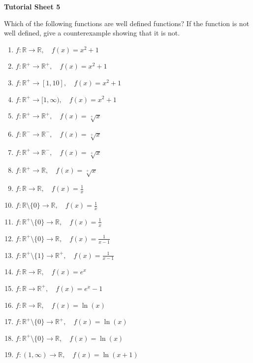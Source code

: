 \documentclass[]{article}
\begin{document}
		\begin{center}
			\textbf{Tutorial Sheet 5}
		\end{center}
		\newpage
		Which of the following functions are well defined functions? If the function is not well defined, give a counterexample showing that it is not.
		\begin{multicols}{2}
			\begin{enumerate}
				\item $f: \mathbb{R} \to \mathbb{R},\quad f(x)=x^2+1$
				\item $f: \mathbb{R}^+ \to \mathbb{R}^+,\quad f(x)=x^2+1$
				\item $f: \mathbb{R}^+ \to [1,10],\quad f(x)=x^2+1$
				\item $f: \mathbb{R}^+ \to [1,\infty),\quad f(x)=x^2+1$
				\item $f: \mathbb{R}^+ \to \mathbb{R}^+,\quad f(x)=\sqrt[+]{x}$
				\item $f: \mathbb{R}^- \to \mathbb{R}^-,\quad f(x)=\sqrt[+]{x}$
				\item $f: \mathbb{R}^+ \to \mathbb{R}^-,\quad f(x)=\sqrt[+]{x}$
				\item $f: \mathbb{R}^+ \to \mathbb{R},\quad f(x)=\sqrt[+]{x}$
				\item $f: \mathbb{R} \to \mathbb{R},\quad f(x)=\frac{1}{x}$
				\item $f: \mathbb{R}\setminus\{0\} \to \mathbb{R},\quad f(x)=\frac{1}{x}$
				\item $f: \mathbb{R}^+\setminus\{0\} \to \mathbb{R},\quad f(x)=\frac{1}{x}$
				\item $f: \mathbb{R}^+\setminus\{0\} \to \mathbb{R},\quad f(x)=\frac{1}{x-1}$
				\item $f: \mathbb{R}^+\setminus\{1\} \to \mathbb{R}^+,\quad f(x)=\frac{1}{x-1}$
				\item $f: \mathbb{R} \to \mathbb{R},\quad f(x)=e^x$
				\item $f: \mathbb{R} \to \mathbb{R}^+,\quad f(x)=e^x-1$
				\item $f: \mathbb{R} \to \mathbb{R},\quad f(x)=\ln(x)$
				\item $f: \mathbb{R}^+\setminus \{0\} \to \mathbb{R}^+,\quad f(x)=\ln(x)$
				\item $f: \mathbb{R}^+\setminus \{0\} \to \mathbb{R},\quad f(x)=\ln(x)$
				\item $f: (1,\infty) \to \mathbb{R},\quad f(x)=\ln(x+1)$
			\end{enumerate}
		\end{multicols}
		
\end{document}
